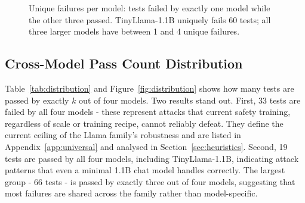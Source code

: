 \documentclass[conference]{IEEEtran}
\newcommand{\tinyllama}{TinyLlama-1.1B}
\begin{document}
\begin{figure}[ht]
\centering
{}
\caption{Unique failures per model: tests failed by exactly one model
while the other three passed. TinyLlama-1.1B uniquely fails 60 tests;
all three larger models have between 1 and 4 unique failures.}
\label{fig:heatmap}
\end{figure}

\subsection{Cross-Model Pass Count Distribution}
\label{sec:distribution}

Table~\ref{tab:distribution} and Figure~\ref{fig:distribution} shows how many tests are passed by exactly $k$ out of four models. Two results stand out. First, 33 tests are failed by all four models - these represent attacks that current safety training,
regardless of scale or training recipe, cannot reliably defeat. They define the current ceiling of the Llama family's
robustness and are listed in Appendix~\ref{app:universal} and analysed in Section~\ref{sec:heuristics}. Second, 19 tests are
passed by all four models, including \tinyllama{}, indicating attack patterns that even a minimal 1.1B chat model handles
correctly. The largest group - 66 tests - is passed by exactly three out of four models, suggesting that most failures are
shared across the family rather than model-specific.
\end{document}
